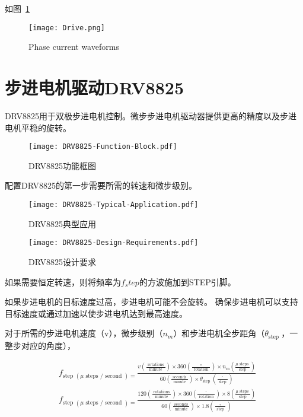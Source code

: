 如图~\ref{fig:Phase-current}

\begin{figure}[htbp]
    \centering
    \texttt{[image: Drive.png]}
    \caption{Phase current waveforms}
    \label{fig:Phase-current}
\end{figure}

\section{步进电机驱动DRV8825}

DRV8825用于双极步进电机控制。微步步进电机驱动器提供更高的精度以及步进电机平稳的旋转。

\begin{figure}[htbp]
    \centering
    \texttt{[image: DRV8825-Function-Block.pdf]}
    \caption{DRV8825功能框图}
    \label{fig:DRV8825-Function-Block}
\end{figure}

配置DRV8825的第一步需要所需的转速和微步级别。

\begin{figure}[htbp]
    \centering
    \texttt{[image: DRV8825-Typical-Application.pdf]}
    \caption{DRV8825典型应用}
    \label{fig:DRV8825-Typical-Application}
\end{figure}


\begin{figure}[htbp]
    \centering
    \texttt{[image: DRV8825-Design-Requirements.pdf]}
    \caption{DRV8825设计要求}
    \label{fig:DRV8825-Design-Requirements}
\end{figure}

如果需要恒定转速，则将频率为$f_step$的方波施加到STEP引脚。

如果步进电机的目标速度过高，步进电机可能不会旋转。 确保步进电机可以支持目标速度或通过加速以使步进电机达到最高速度。

对于所需的步进电机速度（v），微步级别（$n_m$）和步进电机全步距角（$\theta_{\text {step }}$，一整步对应的角度），

\begin{equation}
    \begin{aligned}
    &f_{\text {step }(\mu \text { steps } / \text { second })=} \frac{v\left(\frac{\text { rotations }}{\text { minute }}\right) \times 360\left(\frac{\circ}{\text { rotation }}\right) \times n_{\mathrm{m}}\left(\frac{\mu \text { steps }}{\text { step }}\right)}{60\left(\frac{\text { seconds }}{\text { minute }}\right) \times \theta_{\text {step }}\left(\frac{^{\circ}}{\text { step }}\right)}\\
    &f_{\text {step }(\mu \text { steps } / \text { second })=} \frac{120\left(\frac{\text { rotations }}{\text { minute }}\right) \times 360\left(\frac{^{\circ}}{\text { rotation }}\right) \times 8\left(\frac{\mu \text { steps }}{\text { step }}\right)}{60\left(\frac{\text { seconds }}{\text { minute }}\right) \times 1.8\left(\frac{\circ}{\text { step }}\right)}
    \end{aligned}
\end{equation}

